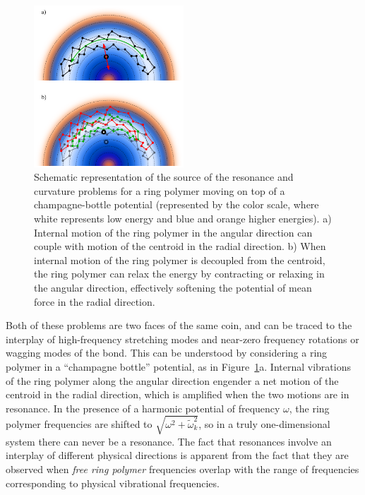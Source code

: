 \documentclass[aps,prb,superscriptaddress,amsmath,amssymb,showpacs,twocolumn]{revtex4}
\begin{document}
\begin{figure}[htbp]
\centering
\includegraphics[width=0.5\textwidth]{figures/champagne.pdf}
\caption{Schematic representation of the source of the resonance and curvature problems for a ring polymer 
moving on top of a champagne-bottle potential (represented by the color scale, where white represents low energy and blue 
and orange higher energies). a) Internal motion of the ring polymer in the angular direction can couple with motion 
of the centroid in the radial direction. b) When internal motion of the ring polymer is decoupled from the centroid, 
the ring polymer can relax the energy by contracting or relaxing in the angular direction, effectively softening the
potential of mean force in the radial direction. }
\label{fig:champagne}
\end{figure}

Both of these problems are two faces of the same coin, and can be traced to the interplay of 
high-frequency stretching modes and near-zero frequency rotations or wagging modes of the bond. 
 This can be understood by considering a ring polymer in a ``champagne bottle'' potential, as in 
Figure~\ref{fig:champagne}a. Internal vibrations of the ring polymer along the angular direction 
engender a net motion of the centroid in the radial direction, which is amplified
when the two motions are in resonance. In the presence of a harmonic potential of frequency $\omega$, 
the ring polymer frequencies are shifted to $\sqrt{\omega^2 + \tilde{\omega}^2_k}$, so in a truly 
one-dimensional system there can never be a resonance. The fact that resonances involve an interplay 
of different physical directions is apparent from the fact that they are observed when \emph{free ring polymer} 
frequencies overlap with the range of frequencies corresponding to physical vibrational frequencies.
\end{document}
